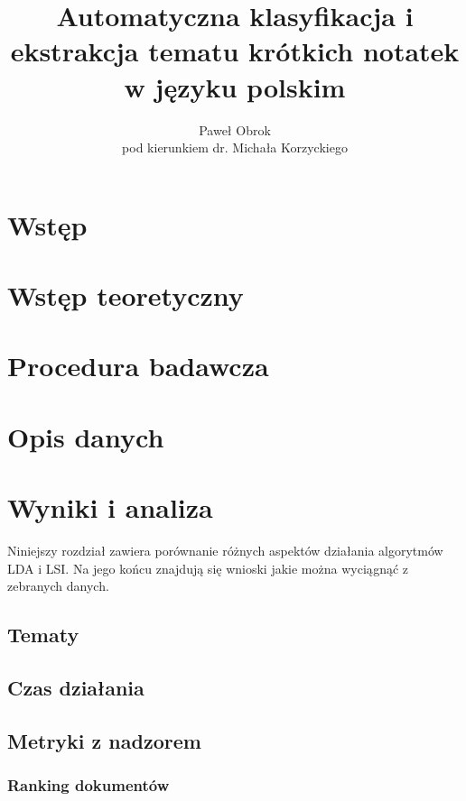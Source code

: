 \documentclass[11pt,a4paper]{article}
\begin{document}
\title{Automatyczna klasyfikacja i ekstrakcja tematu krótkich notatek w języku polskim}
\author{Paweł Obrok\\pod kierunkiem dr. Michała Korzyckiego}

\maketitle
\pagebreak

\tableofcontents
\pagebreak

\section{Wstęp}
\section{Wstęp teoretyczny}
\section{Procedura badawcza}
\section{Opis danych}
\section{Wyniki i analiza}

Niniejszy rozdział zawiera porównanie różnych aspektów działania algorytmów LDA
i LSI. Na jego końcu znajdują się wnioski jakie można wyciągnąć z zebranych
danych.

\subsection{Tematy}

\subsection{Czas działania}

\subsection{Metryki z nadzorem}

\subsubsection{Ranking dokumentów}
\end{document}

